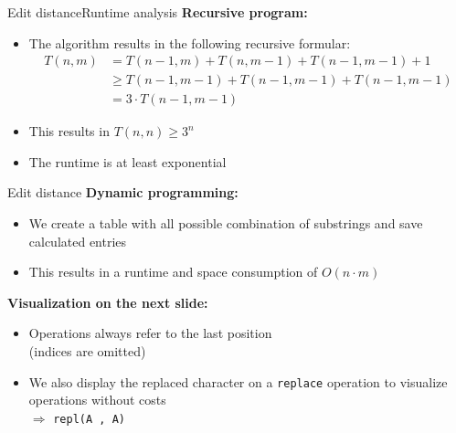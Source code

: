


\begin{frame}{Edit distance}{Runtime analysis}
  \textbf{Recursive program:}
  \begin{itemize}
    \item<2->
      The algorithm results in the following recursive formular:
      \begin{align*}
        T(n, m) &= T(n-1, m) + T(n, m-1) + T(n-1, m-1) + 1\\
        & \geq T(n-1, m-1) + T(n-1, m-1) + T(n-1, m-1)\\
        & = 3 \cdot T(n-1, m-1)
      \end{align*}
    \item<3->
      This results in {\color{MainA}$T(n, n) \geq 3^n$}
    \item<4->[$\Rightarrow$]
      The runtime is at least {\color{MainA}exponential}
  \end{itemize}
\end{frame}


\begin{frame}{Edit distance}
  \textbf{Dynamic programming:}
  \begin{itemize}
    \item<2->
      We create a table with all possible combination of substrings and save
      calculated entries
    \item<2->
      This results in a runtime and space consumption of
      {\color{MainA}$O(n \cdot m)$}
  \end{itemize}
  \vspace{1em}
  \textbf{Visualization on the next slide:}
  \begin{itemize}
    \item<4->
      Operations always refer to the last position\\
      (indices are omitted)
    \item<5->
      We also display the replaced character on a \texttt{replace} operation
      to visualize operations without costs\\
      $\Rightarrow$ \texttt{\color{MainA}repl(\color{MainB}A%
        \color{MainA}, \color{MainB}A\color{MainA})}
  \end{itemize}
\end{frame}

